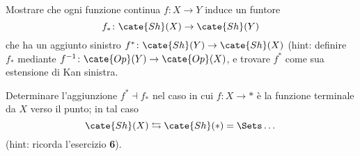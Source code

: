 \begin{MyExercise}
Mostrare che ogni funzione continua $f\colon X\to Y$ induce un funtore
\[
f_*\colon \cate{Sh}(X)\to \cate{Sh}(Y)
\]
che ha un aggiunto sinistro $f^*\colon \cate{Sh}(Y)\to \cate{Sh}(X)$
(hint: definire $f_*$ mediante $f^{-1}\colon \cate{Op}(Y)\to \cate{Op}(X)$, e trovare $f^*$ come sua estensione di Kan sinistra.

Determinare l'aggiunzione $f^*\dashv f_*$ nel caso in cui $f\colon X\to *$ \`e la funzione terminale da $X$ verso il punto; in tal caso
\[
\cate{Sh}(X) \leftrightarrows \cate{Sh}(*) =\Sets\dots
\]
(hint: ricorda l'esercizio \textbf{6}). 
\end{MyExercise}
